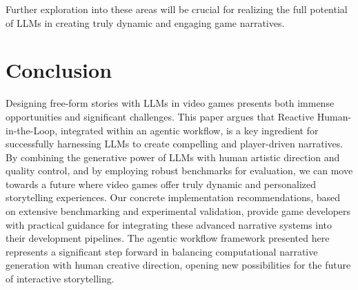 \documentclass{article}
\begin{document}
Further exploration into these areas will be crucial for realizing the full potential of LLMs in creating truly dynamic and engaging game narratives.

\section{Conclusion}

Designing free-form stories with LLMs in video games presents both immense opportunities and significant challenges. This paper argues that Reactive Human-in-the-Loop, integrated within an agentic workflow, is a key ingredient for successfully harnessing LLMs to create compelling and player-driven narratives. By combining the generative power of LLMs with human artistic direction and quality control, and by employing robust benchmarks for evaluation, we can move towards a future where video games offer truly dynamic and personalized storytelling experiences. Our concrete implementation recommendations, based on extensive benchmarking and experimental validation, provide game developers with practical guidance for integrating these advanced narrative systems into their development pipelines. The agentic workflow framework presented here represents a significant step forward in balancing computational narrative generation with human creative direction, opening new possibilities for the future of interactive storytelling.
\end{document}
